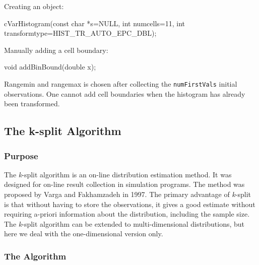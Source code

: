 Creating an object:

\begin{cpp}
cVarHistogram(const char *s=NULL,
              int numcells=11,
              int transformtype=HIST_TR_AUTO_EPC_DBL);
\end{cpp}

Manually adding a cell boundary:

\begin{cpp}
void addBinBound(double x);
\end{cpp}

Rangemin and rangemax is chosen after collecting the
\texttt{numFirstVals} initial observations. One cannot add cell
boundaries when the histogram has already been transformed.





\subsection{The k-split Algorithm}

\subsubsection{Purpose}


The \textit{k}-split algorithm is an on-line distribution
estimation method.  It was
designed for on-line result collection in simulation programs.  The
method was proposed by Varga and Fakhamzadeh in 1997. The primary
advantage of \textit{k}-split is that without having to store the
observations, it gives a good estimate without requiring a-priori
information about the distribution, including the sample size. The
\textit{k}-split algorithm can be extended to multi-dimensional
distributions, but here we deal
with the one-dimensional version only.


\subsubsection{The Algorithm}



